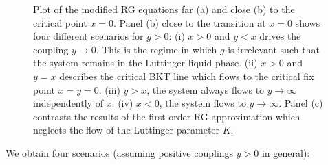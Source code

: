 \documentclass{svmono}
\begin{document}
\begin{figure}
    \caption{Plot of the modified RG equations far (a) and close (b) to the critical point $x=0$. Panel (b) close to the transition at $x=0$ shows four different scenarios for $g>0$: (i) $x>0$ and $y<x$ drives the coupling $y\rightarrow0$. This is the regime in which $g$ is irrelevant such that the system remains in the Luttinger liquid phase. (ii) $x>0$ and $y=x$ describes the critical BKT line which flows to the critical fix point $x=y=0$. (iii) $y>x$, the system always flows to $y\rightarrow\infty$ independently of $x$. (iv) $x<0$, the system flows to $y\rightarrow\infty$. Panel (c) contrasts the results of the first order RG approximation which neglects the flow of the Luttinger parameter $K$.}
    \label{fig:bkt_flow_equations}
\end{figure}

We obtain four scenarios (assuming positive couplings $y>0$ in general):
\end{document}
